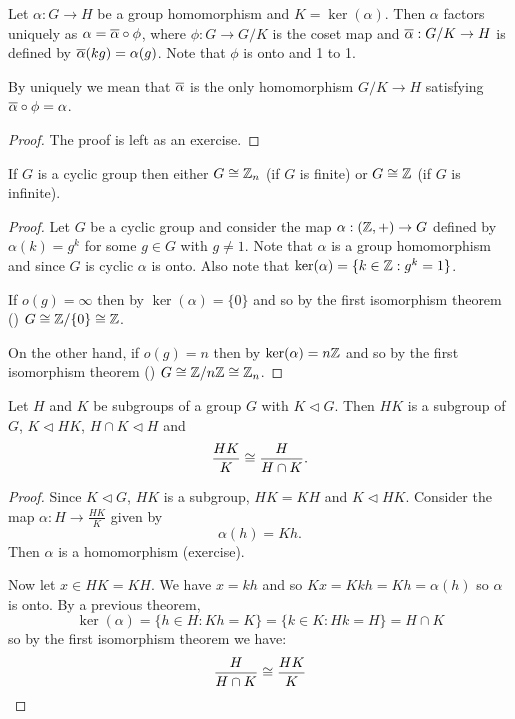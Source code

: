 \documentclass[11pt]{article}
\begin{document}
\begin{proposition}
    Let $\alpha:G\to H$ be a group homomorphism and $K=\ker(\alpha)$. Then $\alpha$ factors uniquely as $\alpha=\overline{\alpha}\circ\phi$, where $\phi:G\to G/K$ is the coset map and $\overline{\alpha}:G/K\to H$ is defined by $\overline{\alpha}(kg)=\alpha(g)$. Note that $\phi$ is onto and 1 to 1.
\end{proposition}

\begin{note}
    By uniquely we mean that $\overline{\alpha}$ is the only homomorphism $G/K\to H$ satisfying $\overline{\alpha}\circ\phi=\alpha$.
\end{note}

\begin{proof}
    The proof is left as an exercise.
\end{proof}

\begin{proposition}
    If $G$ is a cyclic group then either $G\cong\mathbb{Z}_n$ (if $G$ is finite) or $G\cong\mathbb{Z}$ (if $G$ is infinite).
\end{proposition}

\begin{proof}
    Let $G$ be a cyclic group and consider the map $\alpha:(\mathbb{Z},+)\to G$ defined by $\alpha(k)=g^k$ for some $g\in G$ with $g\neq1$. Note that $\alpha$ is a group homomorphism and since $G$ is cyclic $\alpha$ is onto. Also note that $\ker(\alpha)=\{k\in\mathbb{Z}:g^k=1\}$.

    If $o(g)=\infty$ then by  $\ker(\alpha)=\{0\}$ and so by the first isomorphism theorem () $G\cong\mathbb{Z}/\{0\}\cong\mathbb{Z}$.

    On the other hand, if $o(g)=n$ then by  $\ker(\alpha)=n\mathbb{Z}$ and so by the first isomorphism theorem () $G\cong\mathbb{Z}/n\mathbb{Z}\cong\mathbb{Z}_n$.
\end{proof}

\begin{theorem}
    Let $H$ and $K$ be subgroups of a group $G$ with $K\lhd G$. Then $HK$ is a subgroup of $G$, $K\lhd HK$, $H\cap K\lhd H$ and $$\frac{HK}{K}\cong\frac{H}{H\cap K}.$$
\end{theorem}

\begin{proof}
    Since $K\lhd G$, $HK$ is a subgroup, $HK=KH$ and $K\lhd HK$. Consider the map $\alpha:H\to\frac{HK}{K}$ given by
    \[\alpha(h)=Kh.\]
    Then $\alpha$ is a homomorphism (exercise).
    
    Now let $x\in HK=KH$. We have $x=kh$ and so $Kx=Kkh=Kh=\alpha(h)$ so $\alpha$ is onto. By a previous theorem,
    \[\ker(\alpha)=\{h\in H:Kh=K\}=\{k\in K:Hk=H\}=H\cap K\]
    so by the first isomorphism theorem we have:
    \[\frac{H}{H\cap K}\cong\frac{HK}{K}\]
\end{proof}
\end{document}
